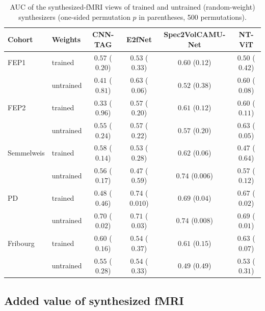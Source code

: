 \begin{table}[!htbp]
    \centering
    \caption{AUC of the synthesized-fMRI views of trained and untrained (random-weight) synthesizers (one-sided permutation $p$ in parentheses, 500 permutations).}
    \label{tab:clf}
    \footnotesize\setlength{\tabcolsep}{3pt}
    \begin{tabular}{@{}l l c c c c@{}}
        \hline
        Cohort & Weights & CNN-TAG & E2fNet & Spec2VolCAMU-Net & NT-ViT \\
        \hline
        FEP1 & trained & $0.57$ ($0.20$) & $0.53$ ($0.33$) & $0.60$ ($0.12$) & $0.50$ ($0.42$) \\
         & untrained & $0.41$ ($0.81$) & $0.63$ ($0.06$) & $0.52$ ($0.38$) & $0.60$ ($0.08$) \\
        FEP2 & trained & $0.33$ ($0.96$) & $0.57$ ($0.20$) & $0.61$ ($0.12$) & $0.60$ ($0.11$) \\
         & untrained & $0.55$ ($0.24$) & $0.57$ ($0.22$) & $0.57$ ($0.20$) & $0.63$ ($0.05$) \\
        Semmelweis & trained & $0.58$ ($0.14$) & $0.53$ ($0.28$) & $0.62$ ($0.06$) & $0.47$ ($0.64$) \\
         & untrained & $0.56$ ($0.17$) & $0.47$ ($0.59$) & $0.74$ ($0.006$) & $0.57$ ($0.12$) \\
        PD & trained & $0.48$ ($0.46$) & $0.74$ ($0.010$) & $0.69$ ($0.04$) & $0.67$ ($0.02$) \\
         & untrained & $0.70$ ($0.02$) & $0.71$ ($0.03$) & $0.74$ ($0.008$) & $0.69$ ($0.01$) \\
        Fribourg & trained & $0.60$ ($0.16$) & $0.54$ ($0.37$) & $0.61$ ($0.15$) & $0.63$ ($0.07$) \\
         & untrained & $0.55$ ($0.28$) & $0.54$ ($0.33$) & $0.49$ ($0.49$) & $0.53$ ($0.31$) \\
        \hline
    \end{tabular}
\end{table}

\subsection{Added value of synthesized fMRI}\label{section:res_delta}


